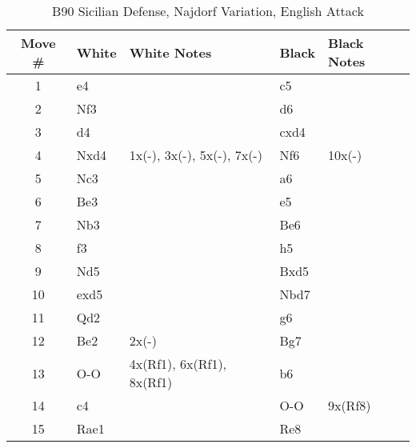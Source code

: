 \begin{table}[htbp]
\centering
\scriptsize
\caption[]{B90 Sicilian Defense, Najdorf Variation, English Attack}
\begin{tabular}{|c|l|p{5cm}|l|p{5cm}|}
\hline
\textbf{Move \#} & \textbf{White} & \textbf{White Notes} & \textbf{Black} & \textbf{Black Notes} \\
\hline
1  & e4    &                     & c5    &                        \\
2  & Nf3   &                     & d6    &                        \\
3  & d4    &                     & cxd4  &                        \\
4  & Nxd4  & 1x(-), 3x(-), 5x(-), 7x(-) & Nf6   & 10x(-)                 \\
5  & Nc3   &                     & a6    &                        \\
6  & Be3   &                     & e5    &                        \\
7  & Nb3   &                     & Be6   &                        \\
8  & f3    &                     & h5    &                        \\
9  & Nd5   &                     & Bxd5  &                        \\
10 & exd5  &                     & Nbd7  &                        \\
11 & Qd2   &                     & g6    &                        \\
12 & Be2   & 2x(-)               & Bg7   &                        \\
13 & O-O   & 4x(Rf1), 6x(Rf1), 8x(Rf1) & b6    &                        \\
14 & c4    &                     & O-O   & 9x(Rf8)                  \\
15 & Rae1  &                     & Re8   &                        \\
\hline
\end{tabular}
\end{table}

